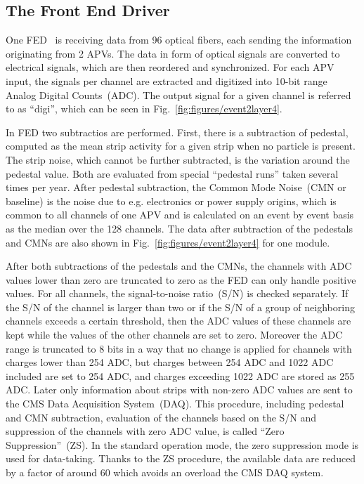 
\subsection{The Front End Driver \label{sec:FED}}
One FED~\cite{Baird:2002wg} is receiving data from 96 optical fibers, each sending the information originating from 2 APVs. The data in form of optical signals are converted to electrical signals, which are then reordered and synchronized. For each APV input, the signals per channel are extracted and digitized into 10-bit range Analog Digital Counts~(ADC). The output signal for a given channel is referred to as ``digi'', which can be seen in Fig.~\ref{fig:figures/event2layer4}.

In FED two subtractios are performed. First, there is a subtraction of pedestal, computed as the mean strip activity for a given strip when no particle is present. The strip noise, which cannot be further subtracted, is the variation around the pedestal value. Both are evaluated from special ``pedestal runs'' taken several times per year. After pedestal subtraction, the Common Mode Noise~(CMN or baseline) is the noise due to e.g. electronics or power supply origins, which is common to all channels of one APV and is calculated on an event by event basis as the median over the 128 channels. The data after subtraction of the pedestals and CMNs are also shown in Fig.~\ref{fig:figures/event2layer4} for one module. 

After both subtractions of the pedestals and the CMNs, the channels with ADC values lower than zero are truncated to zero as the FED can only handle positive values. For all channels, the signal-to-noise ratio~(S/N) is checked separately. If the S/N of the channel is larger than two or if the S/N of a group of neighboring channels exceeds a certain threshold, then the ADC values of these channels are kept while the values of the other channels are set to zero. Moreover the ADC range is truncated to 8 bits in a way that no change is applied for channels with charges lower than 254 ADC, but charges between 254 ADC and 1022 ADC included are set to 254 ADC, and charges exceeding 1022 ADC are stored as 255 ADC. Later only information about strips with non-zero ADC values are sent to the CMS Data Acquisition System~(DAQ).  This procedure, including pedestal and CMN subtraction, evaluation of the channels based on the S/N and suppression of the channels with zero ADC value, is called ``Zero Suppression''~(ZS). In the standard operation mode, the zero suppression mode is used for data-taking. Thanks to the ZS procedure, the available data are reduced by a factor of around 60 which avoids an overload the CMS DAQ system.


